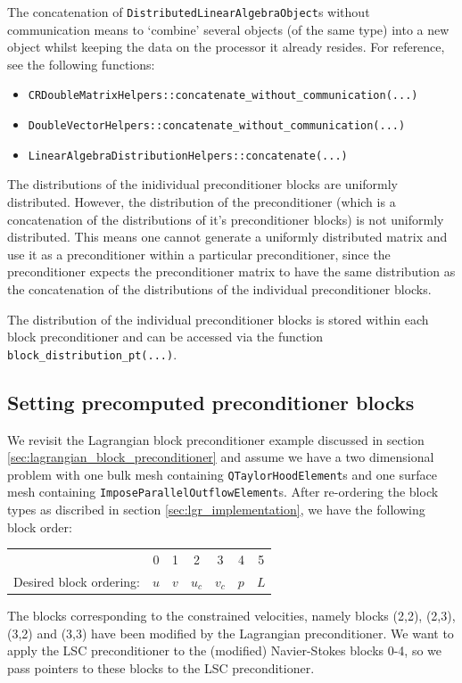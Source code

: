 The concatenation of \texttt{Distributed\-Linear\-Algebra\-Object}s without communication means to `combine' several objects (of the same type) into a new object whilst keeping the data on the processor it already resides. For reference, see the following functions:
\begin{itemize}
\item \texttt{CRDoubleMatrixHelpers::concatenate\_without\_communication(...)}
\item \texttt{DoubleVectorHelpers::concatenate\_without\_communication(...)}
\item \texttt{LinearAlgebraDistributionHelpers::concatenate(...)}
\end{itemize}

The distributions of the inidividual preconditioner blocks are uniformly distributed. However, the distribution of the preconditioner (which is a concatenation of the distributions of it's preconditioner blocks) is not uniformly distributed. This means one cannot generate a uniformly distributed matrix and use it as a preconditioner within a particular preconditioner, since the preconditioner expects the preconditioner matrix to have the same distribution as the concatenation of the distributions of the individual preconditioner blocks.

The distribution of the individual preconditioner blocks is stored within each block preconditioner and can be accessed via the function \texttt{block\-\_distribution\-\_pt(...)}.

\subsection{Setting precomputed preconditioner blocks\label{sec:setting_precomputed_preconditioner_blocks}}

We revisit the Lagrangian block preconditioner example discussed in section \ref{sec:lagrangian_block_preconditioner} and assume we have a two dimensional problem with one bulk mesh containing \texttt{QTaylor\-Hood\-Element}s and one surface mesh containing \texttt{Impose\-Parallel\-Outflow\-Element}s. After re-ordering the block types as discribed in section \ref{sec:lgr_implementation}, we have the following block order:
\begin{center}
    \begin{tabular}{ | r | c c c c c c |}
    \hline
                        & 0   &  1  &  2  &   3    &   4   &  5  \\ 
Desired block ordering: & $u$ & $v$ & $u_c$ & $v_c$& $p$   & $L$ \\ 
    \hline
    \end{tabular}
\end{center}
The blocks corresponding to the constrained velocities, namely blocks (2,2), (2,3), (3,2) and (3,3) have been modified by the Lagrangian preconditioner. We want to apply the LSC preconditioner to the (modified) Navier-Stokes blocks 0-4, so we pass pointers to these blocks to the LSC preconditioner.

